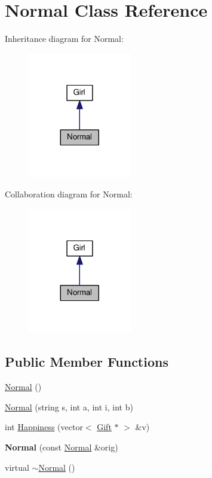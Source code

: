 \hypertarget{class_normal}{\section{Normal Class Reference}
\label{class_normal}
}


Inheritance diagram for Normal\-:
\nopagebreak
\begin{figure}[H]
\begin{center}
\leavevmode
\includegraphics[width=128pt]{class_normal__inherit__graph}
\end{center}
\end{figure}


Collaboration diagram for Normal\-:
\nopagebreak
\begin{figure}[H]
\begin{center}
\leavevmode
\includegraphics[width=128pt]{class_normal__coll__graph}
\end{center}
\end{figure}
\subsection*{Public Member Functions}
\begin{DoxyCompactItemize}
\item 
\hyperlink{class_normal_af62e51ec40dc2eedc3b9ca49ebdc7197}{Normal} ()
\item 
\hyperlink{class_normal_a3ceacfa3b1d8509ecc154d208b4d7f4a}{Normal} (string s, int a, int i, int b)
\item 
int \hyperlink{class_normal_adbeb21b610ef7066b38a21b710a8c034}{Happiness} (vector$<$ \hyperlink{class_gift}{Gift} $\ast$ $>$ \&v)
\item 
\hypertarget{class_normal_a0b0dee43b82bf7e6d1d8ad696e33070a}{{\bfseries Normal} (const \hyperlink{class_normal}{Normal} \&orig)}\label{class_normal_a0b0dee43b82bf7e6d1d8ad696e33070a}

\item 
virtual \hyperlink{class_normal_a2ed547e3b7361c3675224d352cf79740}{$\sim$\-Normal} ()
\end{DoxyCompactItemize}
